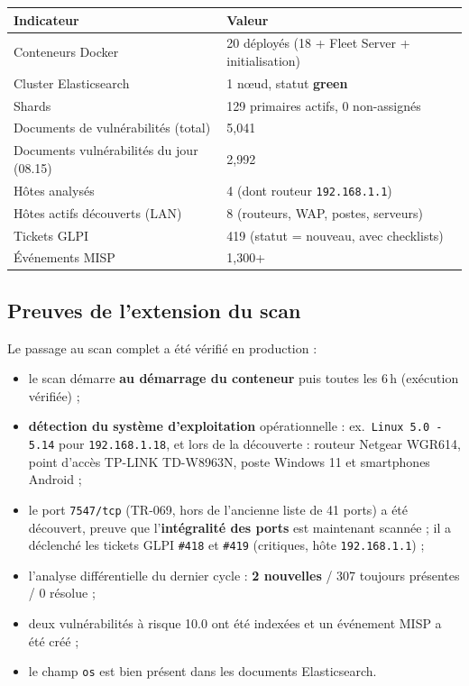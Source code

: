 \begin{center}
\small
\begin{tabularx}{\linewidth}{@{}l X@{}}
\toprule
\textbf{Indicateur} & \textbf{Valeur} \\
\midrule
Conteneurs Docker & 20 d\'eploy\'es (18 + Fleet Server + initialisation) \\
Cluster Elasticsearch & 1 n\oe ud, statut \textcolor{vocgreen}{\textbf{green}} \\
Shards & 129 primaires actifs, 0 non-assign\'es \\
Documents de vuln\'erabilit\'es (total) & 5{,}041 \\
Documents vuln\'erabilit\'es du jour (08.15) & 2{,}992 \\
H\^otes analys\'es & 4 (dont routeur \texttt{192.168.1.1}) \\
H\^otes actifs d\'ecouverts (LAN) & 8 (routeurs, WAP, postes, serveurs) \\
Tickets GLPI & 419 (statut = nouveau, avec checklists) \\
\'Ev\'enements MISP & 1{,}300+ \\
\bottomrule
\end{tabularx}
\end{center}

\subsection{Preuves de l'extension du scan}

Le passage au scan complet a \'et\'e v\'erifi\'e en production :

\begin{itemize}[leftmargin=1.6em]
  \item le scan d\'emarre \textbf{au d\'emarrage du conteneur} puis toutes
        les 6\,h (ex\'ecution v\'erifi\'ee) ;
  \item \textbf{d\'etection du syst\`eme d'exploitation} op\'erationnelle :
        ex.\ \texttt{Linux 5.0 - 5.14} pour \texttt{192.168.1.18}, et lors de
        la d\'ecouverte : routeur Netgear WGR614, point d'acc\`es TP-LINK
        TD-W8963N, poste Windows 11 et smartphones Android ;
  \item le port \texttt{7547/tcp} (TR-069, hors de l'ancienne liste de 41
        ports) a \'et\'e d\'ecouvert, preuve que l'\textbf{int\'egralit\'e des
        ports} est maintenant scann\'ee ; il a d\'eclench\'e les tickets GLPI
        \texttt{\#418} et \texttt{\#419} (critiques, h\^ote
        \texttt{192.168.1.1}) ;
  \item l'analyse diff\'erentielle du dernier cycle : \textbf{2 nouvelles} /
        307 toujours pr\'esentes / 0 r\'esolue ;
  \item deux vuln\'erabilit\'es \`a risque 10.0 ont \'et\'e index\'ees et un
        \'ev\'enement MISP a \'et\'e cr\'e\'e ;
  \item le champ \texttt{os} est bien pr\'esent dans les documents
        Elasticsearch.
\end{itemize}

